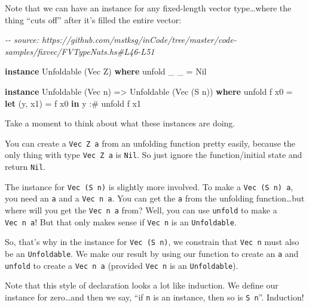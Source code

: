 \documentclass[]{article}
\newenvironment{Shaded}{}{}
\newcommand{\CommentTok}[1]{\textcolor[rgb]{0.38,0.63,0.69}{\textit{#1}}}
\newcommand{\DataTypeTok}[1]{\textcolor[rgb]{0.56,0.13,0.00}{#1}}
\newcommand{\KeywordTok}[1]{\textcolor[rgb]{0.00,0.44,0.13}{\textbf{#1}}}
\newcommand{\NormalTok}[1]{#1}
\newcommand{\OperatorTok}[1]{\textcolor[rgb]{0.40,0.40,0.40}{#1}}
\newcommand{\OtherTok}[1]{\textcolor[rgb]{0.00,0.44,0.13}{#1}}
\begin{document}
Note that we can have an instance for any fixed-length vector type\ldots where
the thing ``cuts off'' after it's filled the entire vector:

\begin{Shaded}
\begin{Highlighting}[]
\CommentTok{{-}{-} source: https://github.com/mstksg/inCode/tree/master/code{-}samples/fixvec/FVTypeNats.hs\#L46{-}L51}

\KeywordTok{instance} \DataTypeTok{Unfoldable}\NormalTok{ (}\DataTypeTok{Vec} \DataTypeTok{Z}\NormalTok{) }\KeywordTok{where}
\NormalTok{    unfold \_ \_ }\OtherTok{=} \DataTypeTok{Nil}

\KeywordTok{instance} \DataTypeTok{Unfoldable}\NormalTok{ (}\DataTypeTok{Vec}\NormalTok{ n) }\OtherTok{=\textgreater{}} \DataTypeTok{Unfoldable}\NormalTok{ (}\DataTypeTok{Vec}\NormalTok{ (}\DataTypeTok{S}\NormalTok{ n)) }\KeywordTok{where}
\NormalTok{    unfold f x0 }\OtherTok{=} \KeywordTok{let}\NormalTok{ (y, x1) }\OtherTok{=}\NormalTok{ f x0}
                  \KeywordTok{in}\NormalTok{  y }\OperatorTok{:\#}\NormalTok{ unfold f x1}
\end{Highlighting}
\end{Shaded}

Take a moment to think about what these instances are doing.

You can create a \texttt{Vec\ Z\ a} from an unfolding function pretty easily,
because the only thing with type \texttt{Vec\ Z\ a} is \texttt{Nil}. So just
ignore the function/initial state and return \texttt{Nil}.

The instance for \texttt{Vec\ (S\ n)} is slightly more involved. To make a
\texttt{Vec\ (S\ n)\ a}, you need an \texttt{a} and a \texttt{Vec\ n\ a}. You
can get the \texttt{a} from the unfolding function\ldots but where will you get
the \texttt{Vec\ n\ a} from? Well, you can use \texttt{unfold} to make a
\texttt{Vec\ n\ a}! But that only makes sense if \texttt{Vec\ n} is an
\texttt{Unfoldable}.

So, that's why in the instance for \texttt{Vec\ (S\ n)}, we constrain that
\texttt{Vec\ n} must also be an \texttt{Unfoldable}. We make our result by using
our function to create an \texttt{a} and \texttt{unfold} to create a
\texttt{Vec\ n\ a} (provided \texttt{Vec\ n} is an \texttt{Unfoldable}).

Note that this style of declaration looks a lot like induction. We define our
instance for zero\ldots and then we say, ``if \texttt{n} is an instance, then so
is \texttt{S\ n}''. Induction!
\end{document}
